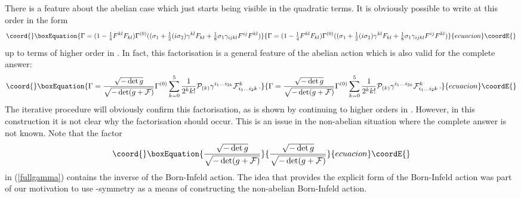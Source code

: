 \documentclass[12pt,a4paper]{article}
\def\half{{\textstyle {1 \over 2}}}
\def\quart{{\textstyle {1 \over 4}}}
\def\noverm#1#2{{\textstyle {#1 \over #2}}}
\begin{document}
There is a feature about the abelian case which
just starts being visible in
the  quadratic terms. It is obviously possible to write \myHighlight{$\Gamma$}\coordHE{} at
this order in the form
\begin{equation}\coord{}\boxEquation{
  \Gamma = (1 - \quart F^{kl}F_{kl})
     \Gamma^{(0)}((\sigma_1+\half(i\sigma_2)
      \gamma^{kl}F_{kl}
      +\noverm{1}{8}\sigma_1\gamma_{ijkl}F^{ij}F^{kl})
}{
  \Gamma = (1 - \quart F^{kl}F_{kl})
     \Gamma^{(0)}((\sigma_1+\half(i\sigma_2)
      \gamma^{kl}F_{kl}
      +\noverm{1}{8}\sigma_1\gamma_{ijkl}F^{ij}F^{kl})
}{ecuacion}\coordE{}\end{equation}
up to terms of higher order in \coordHE{}. In fact, this factorisation
is a general feature
of the abelian action which is also valid for the complete answer:
\begin{equation}\coord{}\boxEquation{
\label{fullgamma}
  \Gamma = {\sqrt{-\det g}\over \sqrt{-\det(g+{\cal F})}}
     \Gamma^{(0)}
     \sum_{k=0}^5 {1\over 2^k k!} {\cal P}_{(k)} \gamma^{i_1\ldots i_{2k}}
       {\cal F}^{k}_{i_1\ldots i_2k}\,.
}{
\Gamma = {\sqrt{-\det g}\over \sqrt{-\det(g+{\cal F})}}
     \Gamma^{(0)}
     \sum_{k=0}^5 {1\over 2^k k!} {\cal P}_{(k)} \gamma^{i_1\ldots i_{2k}}
       {\cal F}^{k}_{i_1\ldots i_2k}\,.
}{ecuacion}\coordE{}\end{equation}
The iterative procedure will obviously confirm this factorisation, as
is shown by continuing to higher orders in \coordHE{}. However, in this
construction it is not clear why the factorisation should occur.
This is  an issue in the non-abelian situation where the
complete answer is not known. Note that the factor
\begin{equation}\coord{}\boxEquation{
     {\sqrt{-\det g}\over \sqrt{-\det(g+{\cal F})}}
}{
     {\sqrt{-\det g}\over \sqrt{-\det(g+{\cal F})}}
}{ecuacion}\coordE{}\end{equation}
in (\ref{fullgamma}) contains the inverse of the Born-Infeld action.
The idea that \myHighlight{$\Gamma$}\coordHE{} provides the explicit form of the
Born-Infeld action was part of our motivation to use \myHighlight{$\kappa$}\coordHE{}-symmetry
as a means of constructing the non-abelian Born-Infeld action.
\end{document}
